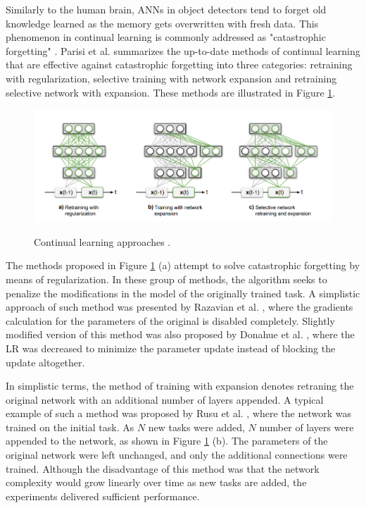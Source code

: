 Similarly to the human brain, ANNs in object detectors tend to forget old knowledge learned as the memory gets overwritten with fresh data. This phenomenon in continual learning is commonly addressed as "catastrophic forgetting" \cite{Parisi2018}. Parisi et al. summarizes the up-to-date methods of continual learning that are effective against catastrophic forgetting into three categories: retraining with regularization, selective training with network expansion and retraining selective network with expansion. These methods are illustrated in Figure \ref{continual}. 

\begin{figure}[htb]
	\begin{center}
		\includegraphics[width=16cm]{./continual.png}
	\end{center}
	\caption{Continual learning approaches
\cite{Parisi2018}.}
	\begin{center}
		\label{continual}
	\end{center}
\end{figure}
\FloatBarrier

The methods proposed in Figure \ref{continual} (a) attempt to solve catastrophic forgetting by means of regularization. In these group of methods, the algorithm seeks to penalize the modifications in the model of the originally trained task. A simplistic approach of such method was presented by Razavian et al.  \cite{Razavian2014}, where the gradients calculation for the parameters of the original is disabled completely. Slightly modified version of this method was also proposed by Donahue et al. \cite{Donahue2013}, where the LR was decreased to minimize the parameter update instead of blocking the update altogether. 


In simplistic terms, the method of training with expansion denotes retraning the original network with an additional number of layers appended. A typical example of such a method was proposed by Rusu et al. \cite{Rusu2016}, where the network was trained on the initial task. As $N$ new tasks were added, $N$ number of layers were appended to the network, as shown in Figure \ref{continual} (b). The parameters of the original network were left unchanged, and only the additional connections were trained. Although the disadvantage of this method was that the network complexity would grow linearly over time as new tasks are added, the experiments delivered sufficient performance. 

